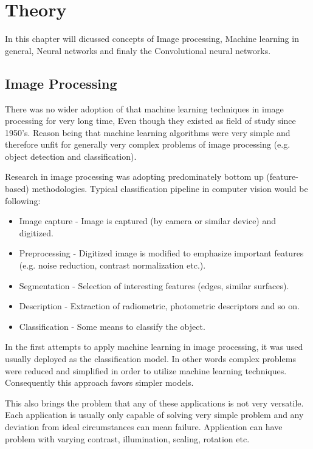 \documentclass[11pt]{article}
\author{Derekin}
\date{\today}
\title{}
\begin{document}
\tableofcontents

\section{Theory}
\label{sec:org133fec0}
In this chapter will dicussed concepts of Image processing, Machine learning in general, Neural networks and finaly the Convolutional neural networks.
\subsection{Image Processing}
\label{sec:org5c690a0}
There was no wider adoption of that machine learning  techniques in image processing for very long time, Even though they existed as field of study since 1950's. Reason being that machine learning algorithms were very simple and therefore unfit for generally very complex problems of image processing (e.g. object detection and classification).

Research in image processing was adopting predominately bottom up (feature-based) methodologies. Typical classification pipeline in computer vision would be following:
\begin{itemize}
\item Image capture - Image is captured (by camera or similar device) and digitized.
\item Preprocessing - Digitized image is modified to emphasize important features (e.g. noise reduction, contrast normalization etc.).
\item Segmentation - Selection of interesting features (edges, similar surfaces).
\item Description - Extraction of radiometric, photometric descriptors and so on.
\item Classification - Some means to classify the object.
\end{itemize}

In the first attempts to apply machine learning in image processing, it was used usually deployed as the classification model. In other words complex problems were reduced and simplified in order to utilize machine learning techniques. Consequently this approach favors simpler models.

This also brings the problem that any of these applications is not very versatile. Each application is usually only capable of solving very simple problem and any deviation from ideal circumstances can mean failure. Application can have problem with varying contrast, illumination, scaling, rotation etc.
\end{document}
